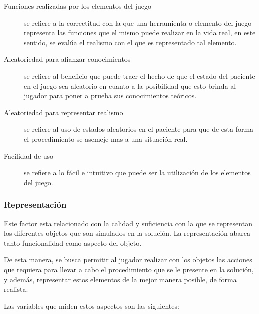\begin{description}

\item[Funciones realizadas por los elementos del juego] se refiere a la
    correctitud con la que una herramienta o elemento del juego representa las
    funciones que el mismo puede realizar en la vida real, en este sentido, se
    evalúa el realismo con el que es representado tal elemento.

\item[Aleatoriedad para afianzar conocimientos] se refiere al beneficio que
    puede traer el hecho de que el estado del paciente en el juego sea aleatorio
    en cuanto a la posibilidad que esto brinda al jugador para poner a prueba
    sus conocimientos teóricos.

\item[Aleatoriedad para representar realismo] se refiere al uso de estados
    aleatorios en el paciente para que de esta forma el procedimiento se asemeje
    mas a una situación real.

\item[Facilidad de uso] se refiere a lo fácil e intuitivo  que puede ser la
    utilización de los elementos del juego.

\end{description}

\subsubsection{Representación}
\label{sec:sub_representacion}

Este factor esta relacionado con la calidad y suficiencia con la que se
representan los diferentes objetos que son simulados en la solución. La
representación abarca tanto funcionalidad como aspecto del objeto.

De esta manera, se busca permitir al jugador realizar con los objetos las
acciones que requiera para llevar a cabo el procedimiento que se le presente en
la solución, y además, representar estos elementos de la mejor manera posible,
de forma realista.

Las variables que miden estos aspectos son las siguientes:

